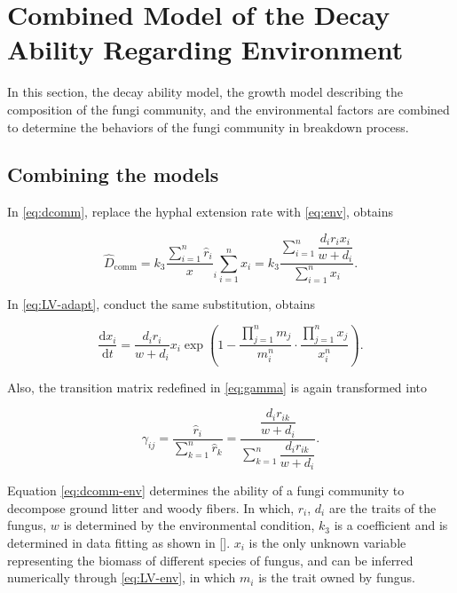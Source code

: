 \section{Combined Model of the Decay Ability Regarding Environment}\label{sec:com}

In this section, the decay ability model, the growth model describing the composition of the fungi community, and the environmental factors are combined to determine the behaviors of the fungi community in breakdown process.

\subsection{Combining the models}

In \eqref{eq:dcomm}, replace the hyphal extension rate with \eqref{eq:env}, obtains

\begin{equation}\label{eq:dcomm-env}
\hat{D}_\text{comm} =
    k_3\frac{\sum_{i=1}^n \hat{r}_i}x_i{\sum_{i=1}^n x_i} =
    k_3\dfrac{\sum\limits_{i=1}^n \dfrac{d_ir_ix_i}
    {w + d_i}}{\sum\limits_{i=1}^n x_i}.
\end{equation}

In \eqref{eq:LV-adapt}, conduct the same substitution, obtains

\begin{equation}\label{eq:LV-env}
    \frac{\mathrm{d}x_i}{\mathrm{d}t} =
    \frac{d_ir_i}{w + d_i}x_i\exp\left(
            1 - \frac{\prod_{j=1}^n m_j}{m_i^n}\cdot
            \frac{\prod_{j=1}^n x_j}{x_i^n}
        \right).
\end{equation}

Also, the transition matrix redefined in \eqref{eq:gamma} is again transformed into

\begin{equation}\label{eq:markov-env}
    \gamma_{ij} = 
    \frac{\hat{r}_i}{\sum_{k=1}^n \hat{r}_k} =
    \frac{\dfrac{d_ir_{ik}}{w + d_i}}
    {\sum\limits_{k=1}^n \dfrac{d_ir_{ik}}{w + d_i}}.
\end{equation}


Equation \eqref{eq:dcomm-env} determines the ability of a fungi community to decompose ground litter and woody fibers. In which, $r_i$, $d_i$ are the traits of the fungus, $w$ is determined by the environmental condition, $k_3$ is a coefficient and is determined in data fitting as shown in []. $x_i$ is the only unknown variable representing the biomass of different species of fungus, and can be inferred numerically through \eqref{eq:LV-env}, in which $m_i$ is the trait owned by fungus.


